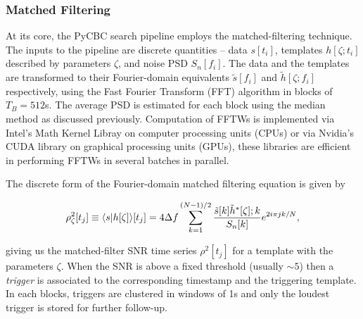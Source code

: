 

\subsubsection{Matched Filtering}
At its core, the PyCBC search pipeline employs the matched-filtering technique. The inputs to the pipeline are discrete quantities -- data $s[t_i]$, templates $h[\zeta;t_i]$ described by parameters $\zeta$, and noise PSD $S_n[f_i]$. The data and the templates are transformed to their Fourier-domain equivalents $\tilde{s}[f_i]$ and $\tilde{h}[\zeta;f_i]$ respectively, using the Fast Fourier Transform (FFT) algorithm in blocks of $T_B = 512$s. The average PSD is estimated for each block using the median method as discussed previously. Computation of FFTWs is implemented via Intel's Math Kernel Libray on computer processing units (CPUs) or via Nvidia's CUDA library on graphical processing units (GPUs), these libraries are efficient in performing FFTWs in several batches in parallel.  


The discrete form of the Fourier-domain matched filtering equation is given by

\begin{align}
    \rho^2_{\zeta}[t_j] \equiv \langle s | h[\zeta] \rangle[t_j] = 4 \Delta f \sum_{k=1}^{(N-1)/2} \dfrac{\tilde{s}[k]\tilde{h}^*[\zeta];k}{S_n[k]}e^{2i\pi j k/N},
\end{align}

giving us the matched-filter SNR time series $\rho^2[t_j]$ for a template with the parameters $\zeta$. When the SNR is above a fixed threshold (usually $\sim 5$) then a \textit{trigger} is associated to the corresponding timestamp and the triggering template. In each blocks, triggers are clustered in windows of 1s and only the loudest trigger is stored for further follow-up. 

